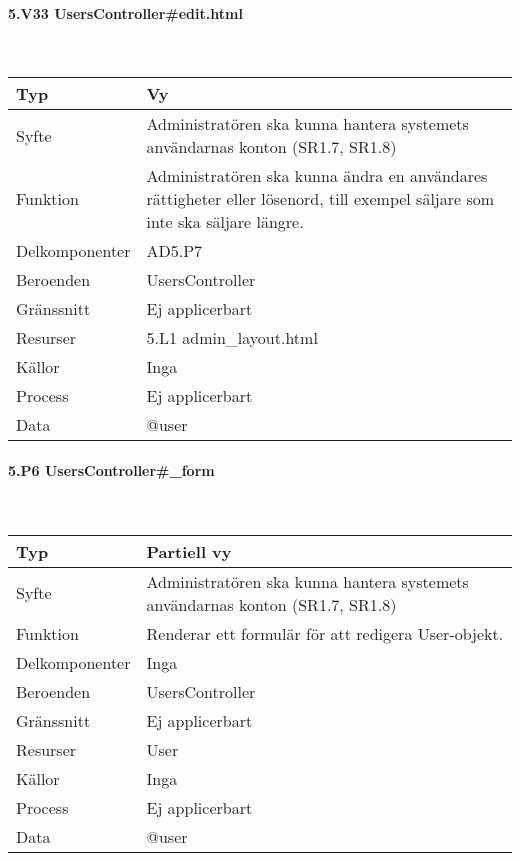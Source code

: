 \documentclass[a4paper, twoside, 11pt, titlepage]{article}
\begin{document}
			\paragraph{5.V33 UsersController\#edit.html}\

			\begin {table} [ht] \begin{tabular} {  p{3.5cm} p{9.6cm} }
				\hline
				Typ & Vy  \\
				\hline
				Syfte & Administratören ska kunna hantera systemets användarnas konton (SR1.7, SR1.8)  \\
				\hline
				Funktion & Administratören ska kunna ändra en användares rättigheter eller lösenord, till exempel säljare som inte ska säljare längre.  \\
				\hline
				Delkomponenter & AD5.P7  \\
				\hline
				Beroenden & UsersController  \\
				\hline
				Gränssnitt & Ej applicerbart  \\
				\hline
				Resurser & 5.L1 admin\_layout.html  \\
				\hline
				Källor & Inga  \\
				\hline
				Process & Ej applicerbart  \\
				\hline
				Data & @user  \\
				\hline
			\end{tabular} \end{table} \FloatBarrier


			\paragraph{5.P6 UsersController\#\_form}\

			\begin {table} [ht] \begin{tabular} {  p{3.5cm} p{9.6cm} }
				\hline
				Typ & Partiell vy  \\
				\hline
				Syfte & Administratören ska kunna hantera systemets användarnas konton (SR1.7, SR1.8)  \\
				\hline
				Funktion & Renderar ett formulär för att redigera User-objekt.  \\
				\hline
				Delkomponenter & Inga  \\
				\hline
				Beroenden & UsersController  \\
				\hline
				Gränssnitt & Ej applicerbart  \\
				\hline
				Resurser & User  \\
				\hline
				Källor & Inga  \\
				\hline
				Process & Ej applicerbart  \\
				\hline
				Data & @user  \\
				\hline
			\end{tabular} \end{table} \FloatBarrier
\end{document}
